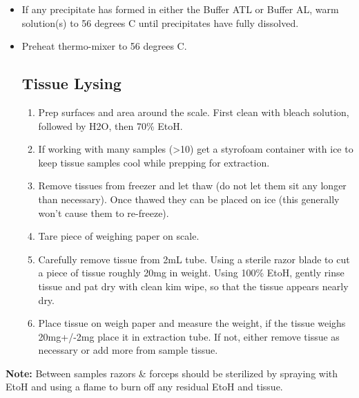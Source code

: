 \documentclass[
  letterpaper,
  DIV=11,
  numbers=noendperiod]{scrreprt}
\begin{document}
\begin{itemize}
\item
  If any precipitate has formed in either the Buffer ATL or Buffer AL,
  warm solution(s) to 56 degrees C until precipitates have fully
  dissolved.
\item
  Preheat thermo-mixer to 56 degrees C.

  \hypertarget{tissue-lysing}{%
  \subsection*{Tissue Lysing}\label{tissue-lysing}}

  \begin{enumerate}
  \def\labelenumi{\arabic{enumi}.}
  \item
    Prep surfaces and area around the scale. First clean with bleach
    solution, followed by H2O, then 70\% EtoH.
  \item
    If working with many samples (\textgreater10) get a styrofoam
    container with ice to keep tissue samples cool while prepping for
    extraction.
  \item
    Remove tissues from freezer and let thaw (do not let them sit any
    longer than necessary). Once thawed they can be placed on ice (this
    generally won't cause them to re-freeze).
  \item
    Tare piece of weighing paper on scale.
  \item
    Carefully remove tissue from 2mL tube. Using a sterile razor blade
    to cut a piece of tissue roughly 20mg in weight. Using 100\% EtoH,
    gently rinse tissue and pat dry with clean kim wipe, so that the
    tissue appears nearly dry.
  \item
    Place tissue on weigh paper and measure the weight, if the tissue
    weighs 20mg+/-2mg place it in extraction tube. If not, either remove
    tissue as necessary or add more from sample tissue.
  \end{enumerate}
\end{itemize}

\textbf{Note:} Between samples razors \& forceps should be sterilized by
spraying with EtoH and using a flame to burn off any residual EtoH and
tissue.
\end{document}
